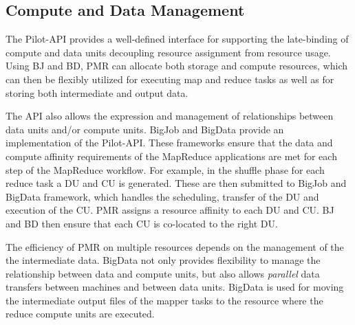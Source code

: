 \documentclass{sig-alternate}
\newcommand{\alnote}[1]{ {\textcolor{blue} { ***andreL: #1 }}}
\newcommand{\alnote}[1]{}
\newcommand{\upp}{\vspace*{-0.5em}}
\begin{document}
\upp
\subsection{Compute and Data Management}

The Pilot-API provides a well-defined interface for supporting the
late-binding of compute and data units decoupling resource assignment
from resource usage. Using BJ and BD, PMR can allocate both storage
and compute resources, which can then be flexibly utilized for
executing map and reduce tasks as well as for storing both
intermediate and output data.

The API also allows the expression and management of relationships
between data units and/or compute units.  BigJob and BigData provide
an implementation of the Pilot-API.  These frameworks ensure that the
data and compute affinity requirements of the MapReduce applications
are met for each step of the MapReduce workflow. For example, in the
shuffle phase for each reduce task a DU and CU is generated. These are
then submitted to BigJob and BigData framework, which handles the
scheduling, transfer of the DU and execution of the CU. PMR assigns a
resource affinity to each DU and CU. BJ and BD then ensure that each
CU is co-located to the right DU.



% 

The efficiency of PMR  on multiple resources depends on
the management of the the intermediate data. BigData not only
provides flexibility to manage the relationship between data and
compute units, but also allows {\it parallel} data transfers between
machines and between data units.  BigData is used for moving the
intermediate output files of the mapper tasks to the resource where
the reduce compute units are executed.  
\end{document}
